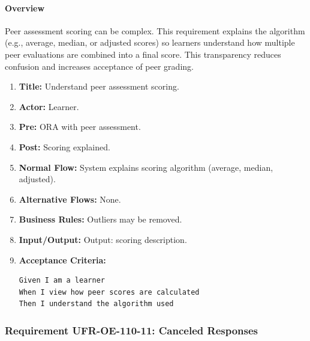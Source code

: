 \paragraph{Overview}
Peer assessment scoring can be complex. This requirement explains the algorithm (e.g., average, median, or adjusted scores) so learners understand how multiple peer evaluations are combined into a final score. This transparency reduces confusion and increases acceptance of peer grading.
\begin{enumerate}[label=\textbf{\arabic*.}]
\item \textbf{Title:} Understand peer assessment scoring.
\item \textbf{Actor:} Learner.
\item \textbf{Pre:} ORA with peer assessment.
\item \textbf{Post:} Scoring explained.
\item \textbf{Normal Flow:} System explains scoring algorithm (average, median, adjusted).
\item \textbf{Alternative Flows:} None.
\item \textbf{Business Rules:} Outliers may be removed.
\item \textbf{Input/Output:} Output: scoring description.
\item \textbf{Acceptance Criteria:}
    \begin{verbatim}
Given I am a learner
When I view how peer scores are calculated
Then I understand the algorithm used
    \end{verbatim}
\end{enumerate}

\subsubsection{Requirement UFR-OE-110-11: Canceled Responses}
